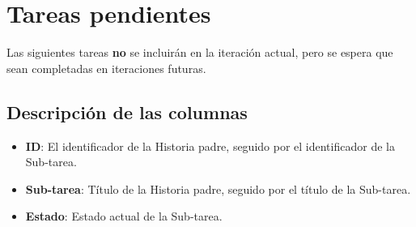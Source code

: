 

\pagebreak

\section{Tareas pendientes}
Las siguientes tareas \textbf{no} se incluirán en la iteración actual, pero se 
espera que sean completadas en iteraciones futuras.

\subsection{Descripción de las columnas}
\begin{itemize}
  \item \textbf{ID}: El identificador de la Historia padre, seguido por el identificador de la Sub-tarea.
  \item \textbf{Sub-tarea}: Título de la Historia padre, seguido por el título de la Sub-tarea.
  \item \textbf{Estado}: Estado actual de la Sub-tarea.
\end{itemize}

